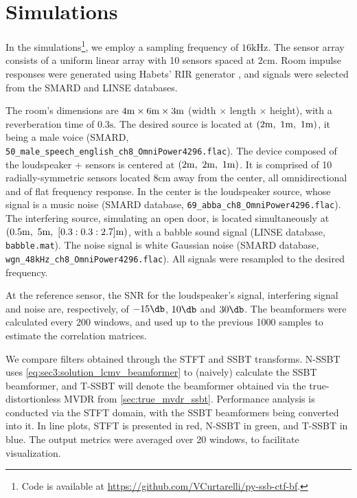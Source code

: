 
\section{Simulations}
\label{sec:results}

In the simulations\footnote{Code is available at \url{https://github.com/VCurtarelli/py-ssb-ctf-bf}.}, we employ a sampling frequency of $16\si{\kilo\hertz}$. The sensor array consists of a uniform linear array with 10 sensors spaced at $2\si{\cm}$. Room impulse responses were generated using Habets' RIR generator \cite{habets_rir-generator}, and signals were selected from the SMARD \cite{smard_database} and LINSE \cite{linse_database} databases.

The room's dimensions are $4\si{\meter} \times 6\si{\meter} \times 3\si{\meter}$ (width $\times$ length $\times$ height), with a reverberation time of $0.3\si{\second}$. The desired source is located at $(2\si{\meter},~1\si{\meter},~1\si{\meter})$, it being a male voice (SMARD, \texttt{50\_male\_speech\_english\_ch8\_OmniPower4296.flac}).
%
The device composed of the loudspeaker + sensors is centered at $(2\si{\meter},~2\si{\meter},~1\si{\meter})$. It is comprised of 10 radially-symmetric sensors located $8\si{\centi\meter}$ away from the center, all omnidirectional and of flat frequency response. In the center is the loudspeaker source, whose signal is a music noise (SMARD database, \texttt{69\_abba\_ch8\_OmniPower4296.flac}). The interfering source, simulating an open door, is located simultaneously at $(0.5\si{\meter},~5\si{\meter},~[0.3:0.3:2.7]\si{\meter})$, with a babble sound signal (LINSE database, \texttt{babble.mat}). The noise signal is white Gaussian noise (SMARD database, \texttt{wgn\_48kHz\_ch8\_OmniPower4296.flac}). All signals were resampled to the desired frequency.

At the reference sensor, the SNR for the loudspeaker's signal, interfering signal and noise are, respectively, of $-15\dB$, $10\dB$ and $30\dB$. The beamformers were calculated every 200 windows, and used up to the previous 1000 samples to estimate the correlation matrices.

We compare filters obtained through the STFT and SSBT transforms. N-SSBT uses \cref{eq:sec3:solution_lcmv_beamformer} to (naively) calculate the SSBT beamformer, and T-SSBT will denote the beamformer obtained via the true-distortionless MVDR from \cref{sec:true_mvdr_ssbt}. Performance analysis is conducted via the STFT domain, with the SSBT beamformers being converted into it. In line plots, STFT is presented in red, N-SSBT in green, and T-SSBT in blue. The output metrics were averaged over 20 windows, to facilitate visualization.

